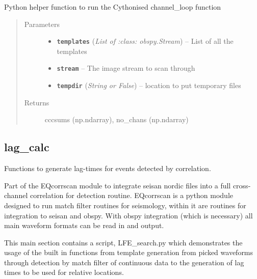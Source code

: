 \documentclass[a4paper,10pt,english]{sphinxmanual}
\begin{document}

\begin{fulllineitems}
\label{core:match_filter.run_channel_loop}
Python helper function to run the Cythonised channel\_loop function
\begin{quote}\begin{description}
\item[{Parameters}] \leavevmode\begin{itemize}
\item {} 
\textbf{\texttt{templates}} (\emph{List of :class: obspy.Stream}) -- List of all the templates

\item {} 
\textbf{\texttt{stream}} -- The image stream to scan through

\item {} 
\textbf{\texttt{tempdir}} (\emph{String or False}) -- location to put temporary files

\end{itemize}

\item[{Returns}] \leavevmode
cccsums (np.ndarray), no\_chans (np.ndarray)

\end{description}\end{quote}

\end{fulllineitems}



\subsection{lag\_calc}
\label{core:lag-calc}\label{core:module-lag_calc}
Functions to generate lag-times for events detected by correlation.

Part of the EQcorrscan module to integrate seisan nordic files into a full
cross-channel correlation for detection routine.
EQcorrscan is a python module designed to run match filter routines for
seismology, within it are routines for integration to seisan and obspy.
With obspy integration (which is necessary) all main waveform formats can be
read in and output.

This main section contains a script, LFE\_search.py which demonstrates the usage
of the built in functions from template generation from picked waveforms
through detection by match filter of continuous data to the generation of lag
times to be used for relative locations.
\end{document}
